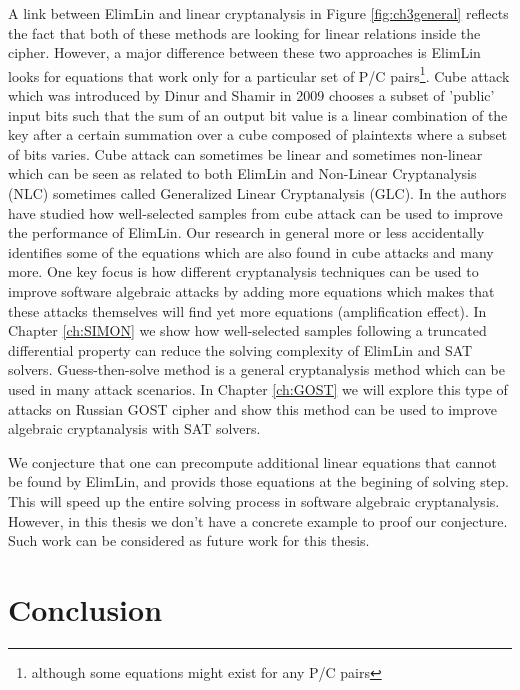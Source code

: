 A link between ElimLin and linear cryptanalysis in Figure \ref{fig:ch3general} reflects the fact that both of these methods are looking for linear relations inside the cipher. However, a major difference between these two approaches is ElimLin looks for equations that work only for a particular set of P/C pairs\footnote{although some equations might exist for any P/C pairs}. Cube attack which was introduced by Dinur and Shamir in 2009 \cite{dinur2009cube} chooses a subset of 'public' input bits such that the sum of an output bit value is a linear combination of the key after a certain summation over a cube composed of plaintexts where a subset of bits varies. Cube attack can sometimes be linear and sometimes non-linear which can be seen as related to both ElimLin and Non-Linear Cryptanalysis (NLC) sometimes called Generalized Linear Cryptanalysis (GLC). In \cite{suvsil2016selection} the authors have studied how well-selected samples from cube attack can be used to improve the performance of ElimLin. Our research in general more or less accidentally identifies some of the equations which are also found in cube attacks and many more. One key focus is how different cryptanalysis techniques can be used to improve software algebraic attacks by adding more equations which makes that these attacks themselves will find yet more equations (amplification effect). 
In Chapter \ref{ch:SIMON} we show how well-selected samples following a truncated differential property can reduce the solving complexity of ElimLin and SAT solvers. Guess-then-solve method is a general cryptanalysis method which can be used in many attack scenarios. In Chapter \ref{ch:GOST} we will explore this type of attacks on Russian GOST cipher and show this method can be used to improve algebraic cryptanalysis with SAT solvers.

We conjecture that one can precompute additional linear equations that cannot be found by ElimLin, and provids those equations at the begining of solving step. This will speed up the entire solving process in software algebraic cryptanalysis. However, in this thesis we don't have a concrete example to proof our conjecture. Such work can be considered as future work for this thesis.

\section{Conclusion}

